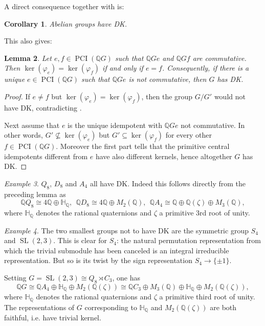 \documentclass[a4paper,10pt]{amsart}
\newtheorem{lemma}{Lemma}[section]
\newtheorem{corollary}[lemma]{Corollary}
\theoremstyle{definition}
\theoremstyle{remark}
\newtheorem{example}[lemma]{Example}
\newcommand\PCI{\operatorname{PCI}}
\newcommand{\Q}{{\mathbb Q}}
\begin{document}
A direct consequence together with \cite[Corollary 3.3.3]{GRG1} is:
\begin{corollary}\label{cor:AbelianHaveDK}
Abelian groups have DK.
\end{corollary}

This also gives:

\begin{lemma}\label{lem:DKavoidsCommutativeComponents}
Let $e,f \in \PCI(\Q G)$ such that $\Q Ge$ and $\Q Gf$ are commutative. Then $\ker(\varphi_e) = \ker(\varphi_f)$ if and only if $e=f$.  Consequently, if there is a unique $e \in \PCI(\Q G)$ such that $\Q Ge$ is not commutative, then $G$ has DK.
\end{lemma}
\begin{proof}
If $e\neq f$ but $\ker(\varphi_e) = \ker(\varphi_f)$, then the group $G/G'$ would not have DK, contradicting .

Next assume that $e$ is the unique idempotent with $\Q Ge$ not commutative. In other words, $G'  \not \subseteq \ker(\varphi_e)$ but $G' \subseteq \ker(\varphi_f)$ for every other $f \in \PCI(\Q G)$.  Moreover the first part tells that the primitive central idempotents different from $e$ have also different kernels, hence altogether $G$ has DK.
\end{proof}


\begin{example}\label{ex:DKForQ8AndFriends}
$Q_8$, $D_8$ and $A_4$ all have DK. Indeed this follows directly from the preceding lemma as
\[\Q Q_8 \cong 4\Q \oplus \mathbb{H}_{\Q}, \ \ \Q D_8 \cong 4\mathbb{Q} \oplus M_2(\Q), \ \ \Q A_4 \cong \Q \oplus \Q(\zeta) \oplus M_3(\Q), \]
where $\mathbb{H}_{\Q}$ denotes the rational quaternions and $\zeta$ a primitive 3rd root of unity.
\end{example}

\begin{example}\label{ex:SL23}
The two smallest groups not to have DK are the symmetric group $S_4$ and $\operatorname{SL}(2,3)$. This is clear for $S_4$: the natural permutation representation from which the trivial submodule has been canceled is an integral irreducible representation. But so is its twist by the sign representation $S_4 \rightarrow \{\pm1 \}$.

 Setting $G = \operatorname{SL}(2,3) \cong Q_8 \rtimes C_3$, one has
\[\mathbb{Q}G \cong \mathbb{Q}A_4 \oplus \mathbb{H}_\Q \oplus M_2(\mathbb{Q}(\zeta)) \cong \mathbb{Q}C_3 \oplus M_3(\Q) \oplus \mathbb{H}_\Q \oplus M_2(\mathbb{Q}(\zeta)), \]
where $\mathbb{H}_\Q$ denotes the rational quaternions and $\zeta$ a primitive third root of unity. The representations of $G$ corresponding to $\mathbb{H}_\Q$ and $M_2(\mathbb{Q}(\zeta))$ are both faithful, i.e. have trivial kernel.
\end{example}
\end{document}
